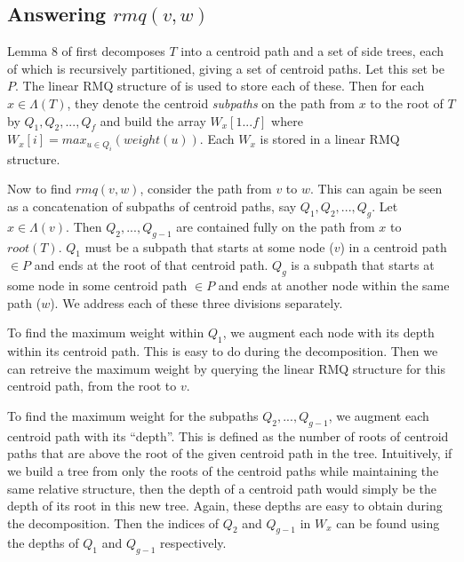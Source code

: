 \documentclass{article}
\newcommand{\leafset}{\Lambda}
\begin{document}
    \subsection{Answering $rmq(v, w)$}
    \label{subsec:answeringrmq}

    Lemma 8 of \cite{jansson2018algorithms} first decomposes $T$ into a centroid path and a set of side trees, each of which is recursively partitioned, giving a set of centroid paths. Let this set be $P$. The linear RMQ structure of \cite{bender2000lca} is used to store each of these. Then for each $x \in \leafset(T)$, they denote the centroid \textit{subpaths} on the path from $x$ to the root of $T$ by $Q_1, Q_2, ..., Q_f$ and build the array $W_x[1 ... f]$ where $W_x[i] = max_{u \in Q_i}(weight(u))$. Each $W_x$ is stored in a linear RMQ structure.

    Now to find $rmq(v, w)$, consider the path from $v$ to $w$. This can again be seen as a concatenation of subpaths of centroid paths, say $Q_1, Q_2, ..., Q_g$. Let $x \in \leafset(v)$. Then $Q_2, ..., Q_{g - 1}$ are contained fully on the path from $x$ to $root(T)$. $Q_1$ must be a subpath that starts at some node ($v$) in a centroid path $\in P$ and ends at the root of that centroid path. $Q_g$ is a subpath that starts at some node in some centroid path $\in P$ and ends at another node within the same path ($w$). We address each of these three divisions separately.

    To find the maximum weight within $Q_1$, we augment each node with its depth within its centroid path. This is easy to do during the decomposition. Then we can retreive the maximum weight by querying the linear RMQ structure for this centroid path, from the root to $v$.

    To find the maximum weight for the subpaths $Q_2, ..., Q_{g - 1}$, we augment each centroid path with its ``depth''. This is defined as the number of roots of centroid paths that are above the root of the given centroid path in the tree. Intuitively, if we build a tree from only the roots of the centroid paths while maintaining the same relative structure, then the depth of a centroid path would simply be the depth of its root in this new tree. Again, these depths are easy to obtain during the decomposition. Then the indices of $Q_2$ and $Q_{g-1}$ in $W_x$ can be found using the depths of $Q_1$ and $Q_{g - 1}$ respectively.
\end{document}
